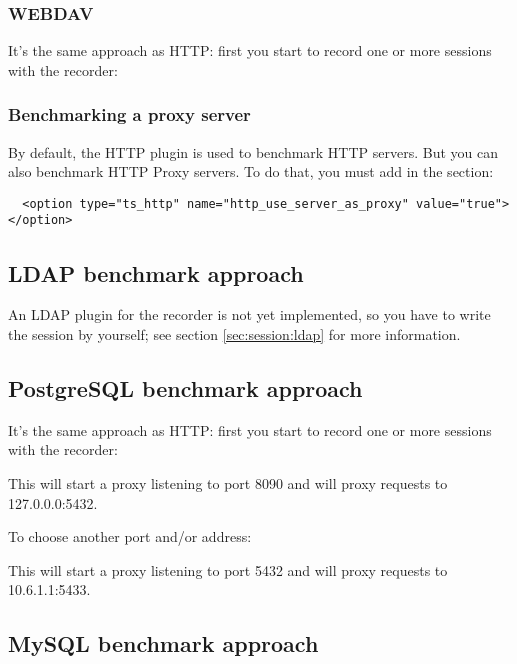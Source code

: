 \documentclass{TSUNG-en}
\begin{document}
\subsubsection{WEBDAV }

It's the same approach as HTTP: first you start to record one or more
sessions with the recorder:

\subsubsection{Benchmarking a proxy server}

By default, the HTTP plugin is used to benchmark HTTP servers. But you
can also benchmark HTTP Proxy servers. To do that, you must add in the
 section:

\begin{Verbatim}
  <option type="ts_http" name="http_use_server_as_proxy" value="true"></option>
\end{Verbatim}


\subsection{LDAP benchmark approach}

An LDAP plugin for the recorder is not yet implemented, so you have to
write the session by yourself; see section \ref{sec:session:ldap} for
more information.

\subsection{PostgreSQL benchmark approach}

It's the same approach as HTTP: first you start to record one or more
sessions with the recorder:

This will start a proxy listening to port 8090 and will proxy requests
to 127.0.0.0:5432.

To choose another port and/or address:

This will start a proxy listening to port 5432 and will proxy requests
to 10.6.1.1:5433.

\subsection{MySQL benchmark approach}
\end{document}
